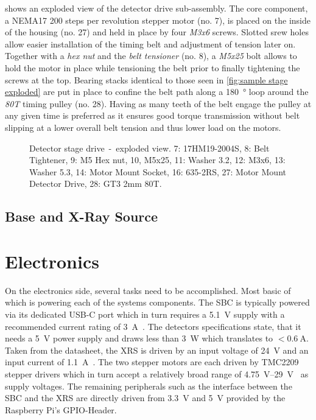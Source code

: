              shows an exploded view of the detector drive sub-assembly.
            The core component, a NEMA17 \num{200} steps per revolution stepper motor (no. 7), is placed on the inside of the housing (no. 27) and held in place by four \textit{M3x6} screws.
            Slotted srew holes allow easier installation of the timing belt and adjustment of tension later on.
            Together with a \textit{hex nut} and the \textit{belt tensioner} (no. 8), a \textit{M5x25} bolt allows to hold the motor in place while tensioning the belt prior to finally tightening the screws at the top.
            Bearing stacks identical to those seen in \cref{fig:sample stage exploded} are put in place to confine the belt path along a \qty{180}{\degree} loop around the \textit{80T} timing pulley (no. 28).
            Having as many teeth of the belt engage the pulley at any given time is preferred as it ensures good torque transmission without belt slipping at a lower overall belt tension and thus lower load on the motors.
            \begin{figure}[h]
                \centering
                
                \caption[Detector stage drive~-~exploded view.]{Detector stage drive~-~exploded view. 7: 17HM19-2004S, 8: Belt Tightener, 9: M5 Hex nut, 10, M5x25, 11: Washer 3.2, 12: M3x6, 13: Washer 5.3, 14: Motor Mount Socket, 16: 635-2RS, 27: Motor Mount Detector Drive, 28: GT3 2mm 80T.}
                \label{fig:detector drive exploded}
            \end{figure}

        \subsection{Base and X-Ray Source}
            \lipsum

    \section{Electronics}
        On the electronics side, several tasks need to be accomplished.
        Most basic of which is powering each of the systems components.
        The SBC is typically powered via its dedicated USB-C port which in turn requires a \qty{5.1}{\volt} supply with a recommended current rating of \qty{3}{\ampere}~\cite{Manual.Documentation.RPF}.
        The detectors specifications state, that it needs a \qty{5}{\volt} power supply and draws less than \qty{3}{\watt} which translates to \(<\qty{0.6}{\ampere}\).
        Taken from the datasheet, the XRS is driven by an input voltage of \qty{24}{\volt} and an input current of \qty{1.1}{\ampere}~\cite{Manual.MAGPRODataSheet.QD}.
        The two stepper motors are each driven by TMC2209 stepper drivers which in turn accept a relatively broad range of \qtyrange{4.75}{29}{\volt}~\cite{Manual.TMC2209Datasheet} as supply voltages.
        The remaining peripherals such as the interface between the SBC and the XRS are directly driven from \qty{3.3}{\volt} and \qty{5}{\volt} provided by the Raspberry Pi's GPIO-Header.

